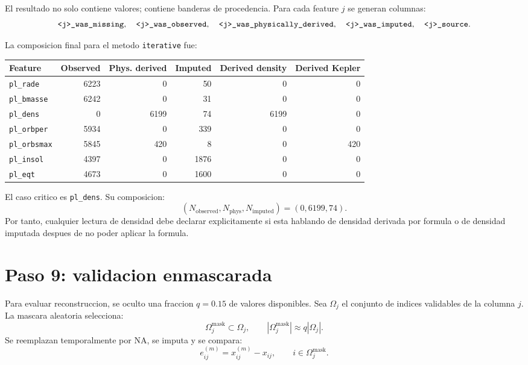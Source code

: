 \documentclass[11pt,letterpaper]{article}
\newcommand{\code}[1]{\ifmmode\text{\texttt{#1}}\else\texttt{#1}\fi}
\newcommand{\method}{\code{iterative}}
\newcommand{\missing}{\mathrm{NA}}
\begin{document}
El resultado no solo contiene valores; contiene banderas de procedencia. Para
cada feature \(j\) se generan columnas:
\[
\code{<j>\_was\_missing},\quad
\code{<j>\_was\_observed},\quad
\code{<j>\_was\_physically\_derived},\quad
\code{<j>\_was\_imputed},\quad
\code{<j>\_source}.
\]

La composicion final para el metodo \method{} fue:
\begin{center}
\begin{tabular}{lrrrrr}
\toprule
Feature & Observed & Phys. derived & Imputed & Derived density & Derived Kepler\\
\midrule
\code{pl\_rade}    & 6223 & 0    & 50   & 0    & 0\\
\code{pl\_bmasse}  & 6242 & 0    & 31   & 0    & 0\\
\code{pl\_dens}    & 0    & 6199 & 74   & 6199 & 0\\
\code{pl\_orbper}  & 5934 & 0    & 339  & 0    & 0\\
\code{pl\_orbsmax} & 5845 & 420  & 8    & 0    & 420\\
\code{pl\_insol}   & 4397 & 0    & 1876 & 0    & 0\\
\code{pl\_eqt}     & 4673 & 0    & 1600 & 0    & 0\\
\bottomrule
\end{tabular}
\end{center}

El caso critico es \code{pl\_dens}. Su composicion:
\[
  (N_{\mathrm{observed}}, N_{\mathrm{phys}}, N_{\mathrm{imputed}})
  =
  (0,6199,74).
\]
Por tanto, cualquier lectura de densidad debe declarar explicitamente si esta
hablando de densidad derivada por formula o de densidad imputada despues de no
poder aplicar la formula.

\section{Paso 9: validacion enmascarada}

Para evaluar reconstruccion, se oculto una fraccion \(q=0.15\) de valores
disponibles. Sea \(\Omega_j\) el conjunto de indices validables de la columna
\(j\). La mascara aleatoria selecciona:
\[
  \Omega_j^{\mathrm{mask}}\subset\Omega_j,
  \qquad
  |\Omega_j^{\mathrm{mask}}|\approx q|\Omega_j|.
\]
Se reemplazan temporalmente por \(\missing\), se imputa y se compara:
\[
  e_{ij}^{(m)} =
  \widehat{x}_{ij}^{(m)} - x_{ij},
  \qquad
  i\in\Omega_j^{\mathrm{mask}}.
\]
\end{document}
